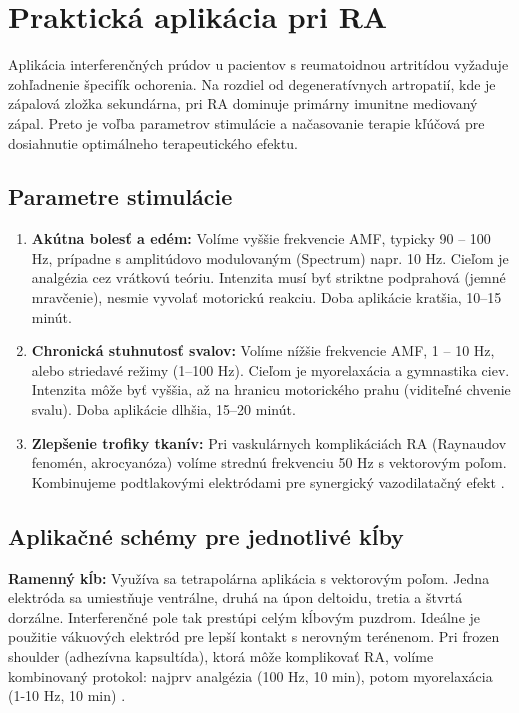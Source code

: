 \section{Praktická aplikácia pri RA}

Aplikácia interferenčných prúdov u pacientov s reumatoidnou artritídou vyžaduje zohľadnenie špecifík ochorenia. Na rozdiel od degeneratívnych artropatií, kde je zápalová zložka sekundárna, pri RA dominuje primárny imunitne mediovaný zápal. Preto je voľba parametrov stimulácie a načasovanie terapie kľúčová pre dosiahnutie optimálneho terapeutického efektu.

\subsection{Parametre stimulácie}

\begin{enumerate}
    \item \textbf{Akútna bolesť a edém:} Volíme vyššie frekvencie AMF, typicky 90 – 100 Hz, prípadne s amplitúdovo modulovaným (Spectrum) napr. 10 Hz. Cieľom je analgézia cez vrátkovú teóriu. Intenzita musí byť striktne podprahová (jemné mravčenie), nesmie vyvolať motorickú reakciu. Doba aplikácie kratšia, 10–15 minút.
    \item \textbf{Chronická stuhnutosť svalov:} Volíme nížšie frekvencie AMF, 1 – 10 Hz, alebo striedavé režimy (1–100 Hz). Cieľom je myorelaxácia a gymnastika ciev. Intenzita môže byť vyššia, až na hranicu motorického prahu (viditeľné chvenie svalu). Doba aplikácie dlhšia, 15–20 minút.
    \item \textbf{Zlepšenie trofiky tkanív:} Pri vaskulárnych komplikáciách RA (Raynaudov fenomén, akrocyanóza) volíme strednú frekvenciu 50 Hz s vektorovým poľom. Kombinujeme podtlakovými elektródami pre synergický vazodilatačný efekt \parencite{Capko1998}.
\end{enumerate}

\subsection{Aplikačné schémy pre jednotlivé kĺby}

\textbf{Ramenný kĺb:} Využíva sa tetrapolárna aplikácia s vektorovým poľom. Jedna elektróda sa umiestňuje ventrálne, druhá na úpon deltoidu, tretia a štvrtá dorzálne. Interferenčné pole tak prestúpi celým kĺbovým puzdrom. Ideálne je použitie vákuových elektród pre lepší kontakt s nerovným terénenom. Pri frozen shoulder (adhezívna kapsultída), ktorá môže komplikovať RA, volíme kombinovaný protokol: najprv analgézia (100 Hz, 10 min), potom myorelaxácia (1-10 Hz, 10 min) \parencite{Navratil2019}.


